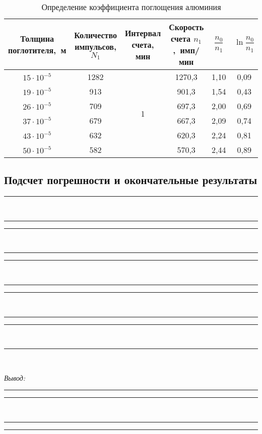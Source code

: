 \documentclass[10pt, pscyr, nonums]{hedlabwork}
\begin{document}
  \begin{table}[h!]
    \center
    \caption{Определение коэффициента поглощения алюминия}
    \begin{tabular}{|*{6}{C{.13}|}} \hline
      Толщина поглотителя,~м &
        Количество импульсов, \( N_1 \) &
        Интервал счета, мин &
        Скорость счета \( n_1 \),~имп/мин &
        \( \dfrac{n_0}{n_1} \) &
        \( \ln\dfrac{n_0}{n_1} \) \\ \hline
      \( 15 \cdot 10^{-5} \) & 1282 &  &
        1270,3 & 1,10 & 0,09 \\ 
      \( 19 \cdot 10^{-5} \) & 913 &&
        901,3  & 1,54 & 0,43 \\ 
      \( 26 \cdot 10^{-5} \) & 709 &&
        697,3  & 2,00 & 0,69 \\ 
      \( 37 \cdot 10^{-5} \) & 679 &&
        667,3  & 2,09 & 0,74 \\ 
      \( 43 \cdot 10^{-5} \) & 632 &&
        620,3  & 2,24 & 0,81 \\ 
      \( 50 \cdot 10^{-5} \) & 582 &&
        570,3  & 2,44 & 0,89 \\ \hline
    \end{tabular}
  \end{table}
  \pagebreak

  \subsection{Подсчет погрешности и окончательные результаты}
  \center
  \rule{.95\textwidth}{.5pt} \\ \rule{.95\textwidth}{.5pt}
  \rule{.95\textwidth}{.5pt} \\ \rule{.95\textwidth}{.5pt}
  \rule{.95\textwidth}{.5pt} \\ \rule{.95\textwidth}{.5pt}
  \rule{.95\textwidth}{.5pt} \\ \rule{.95\textwidth}{.5pt}
  \rule{.95\textwidth}{.5pt} \\ \rule{.95\textwidth}{.5pt} \\
  \vspace*{2em}

  \emph{Вывод:} \rule{.885\textwidth}{.5pt}
  \rule{.95\textwidth}{.5pt} \\ \rule{.95\textwidth}{.5pt}
  \rule{.95\textwidth}{.5pt}
\end{document}
